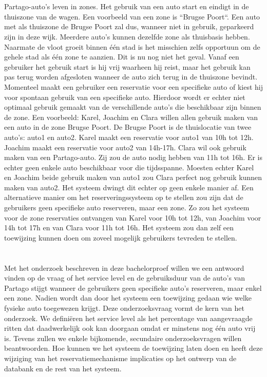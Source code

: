 \section{}
\label{sec:probleemstelling}
Partago-auto's leven in zones. Het gebruik van een auto start en eindigt in de thuiszone van de wagen. Een voorbeeld van een zone is ``Brugse Poort``. Een auto met als thuiszone de Brugse Poort zal dus, wanneer niet in gebruik, geparkeerd zijn in deze wijk. Meerdere auto's kunnen dezelfde zone als thuisbasis hebben. Naarmate de vloot groeit binnen één stad is het misschien zelfs opportuun om de gehele stad als één zone te aanzien. Dit is nu nog niet het geval. Vanaf een gebruiker het gebruik start is hij vrij waarheen hij reist, maar het gebruik kan pas terug worden afgesloten wanneer de auto zich terug in de thuiszone bevindt. Momenteel maakt een gebruiker een reservatie voor een specifieke auto of kiest hij voor spontaan gebruik van een specifieke auto. Hierdoor wordt er echter niet optimaal gebruik gemaakt van de verschillende auto's die beschikbaar zijn binnen de zone. Een voorbeeld: Karel, Joachim en Clara willen allen gebruik maken van een auto in de zone Brugse Poort. De Brugse Poort is de thuislocatie van twee auto's: auto1 en auto2. Karel maakt een reservatie voor auto1 van 10h tot 12h. Joachim maakt een reservatie voor auto2 van 14h-17h. Clara wil ook gebruik maken van een Partago-auto. Zij zou de auto nodig hebben van 11h tot 16h. Er is echter geen enkele auto beschikbaar voor die tijdsspanne. Moesten echter Karel en Joachim beide gebruik maken van auto1 zou Clara perfect nog gebruik kunnen maken van auto2. Het systeem dwingt dit echter op geen enkele manier af. Een alternatieve manier om het reserveringssysteem op te stellen zou zijn dat de gebruikers geen specifieke auto reserveren, maar een zone. Zo zou het systeem voor de zone reservaties ontvangen van Karel voor 10h tot 12h, van Joachim voor 14h tot 17h en van Clara voor 11h tot 16h. Het systeem zou dan zelf een toewijzing kunnen doen om zoveel mogelijk gebruikers tevreden te stellen.

\section{}
\label{sec:onderzoeksvraag}

Met het onderzoek beschreven in deze bachelorproef willen we een antwoord vinden op de vraag of het service level en de gebruiksduur van de auto's van Partago stijgt wanneer de gebruikers geen specifieke auto's reserveren, maar enkel een zone. Nadien wordt dan door het systeem een toewijzing gedaan wie welke fysieke auto toegewezen krijgt. Deze onderzoeksvraag vormt de kern van het onderzoek. We definiëren het service level als het percentage van aangevraagde ritten dat daadwerkelijk ook kan doorgaan omdat er minstens nog één auto vrij is. Tevens zullen we enkele bijkomende, secundaire onderzoeksvragen willen beantwoorden. Hoe kunnen we het systeem de toewijzing laten doen en heeft deze wijziging van het reservatiemechanisme implicaties op het ontwerp van de databank en de rest van het systeem.

